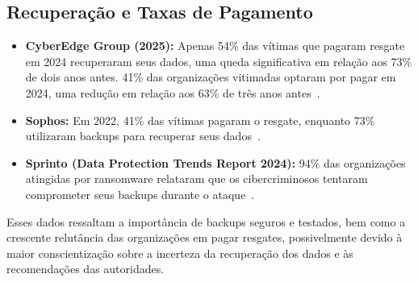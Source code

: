 \subsection{Recuperação e Taxas de Pagamento}
\begin{itemize}
    \item \textbf{CyberEdge Group (2025):} Apenas 54\% das vítimas que pagaram resgate em 2024 recuperaram seus dados, uma queda significativa em relação aos 73\% de dois anos antes. 41\% das organizações vitimadas optaram por pagar em 2024, uma redução em relação aos 63\% de três anos antes~\cite{CyberEdgeCDR2025}.
    \item \textbf{Sophos:} Em 2022, 41\% das vítimas pagaram o resgate, enquanto 73\% utilizaram backups para recuperar seus dados~\cite{SophosStateOfRansomware2024}.
    \item \textbf{Sprinto (Data Protection Trends Report 2024):} 94\% das organizações atingidas por ransomware relataram que os cibercriminosos tentaram comprometer seus backups durante o ataque~\cite{SprintoRansomwareStats2025}.
\end{itemize}

Esses dados ressaltam a importância de backups seguros e testados, bem como a crescente relutância das organizações em pagar resgates, possivelmente devido à maior conscientização sobre a incerteza da recuperação dos dados e às recomendações das autoridades.














